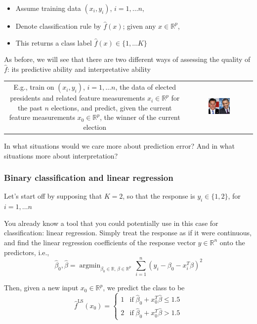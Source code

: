 \documentclass[mathserif]{beamer}
\newcommand{\argmin}{\mathop{\mathrm{argmin}}}
\def\R{\mathds{R}}
\def\hbeta{\hat{\beta}}
\def\red{\color[rgb]{0.8,0,0}}
\begin{document}
\begin{frame}
\frametitle{}
\begin{itemize}
\item Assume training data $(x_i,y_i)$, $i=1,\ldots n$, 
\item Denote
classification rule by $\hat{f}(x)$; given any $x \in \R^p$, 
\item This returns a 
class label $\hat{f}(x) \in \{1,\ldots K\}$
\end{itemize}

\bigskip
As before, we will see that there are two different ways of assessing the quality 
of $\hat{f}$: its {\red predictive ability} and {\red interpretative ability}

\bigskip
\begin{tabular}{cc}
\parbox{0.5\textwidth}{
E.g., train on $(x_i,y_i)$, $i=1,\ldots n$, the data of elected presidents
and related feature measurements $x_i \in \R^p$ for the past $n$ elections,
and predict, given the current feature measurements $x_0 \in \R^p$, the winner 
of the current election}&
\hspace{3pt}
\parbox{0.35\textwidth}{
\includegraphics[width=0.35\textwidth]{candidates.jpg}
}
\end{tabular}

\bigskip
In what situations would we care more about prediction error? And in what 
situations more about interpretation?
\end{frame}

\begin{frame}
\frametitle{Binary classification and linear regression}
Let's start off by supposing that $K=2$, so that the response is 
$y_i \in \{1,2\}$, for $i=1,\ldots n$

\bigskip
You already know a tool that you could potentially use in this case for classification:
{\red linear regression}. Simply treat the response
as if it were continuous, and find the linear regression coefficients 
of the response vector $y \in \R^n$ onto the predictors, i.e., 
$$\hbeta_0, \hbeta = \argmin_{\beta_0\in\R, \,\beta \in \R^p} \, 
\sum_{i=1}^n (y_i - \beta_0 - x_i^T \beta)^2 $$

Then, given a new input $x_0 \in \R^p$, we predict the class to be
$$\hat{f}^\mathrm{LS}(x_0) = \begin{cases}
1 & \mathrm{if}\; \hbeta_0 + x_0^T \hbeta \leq 1.5 \\
2 & \mathrm{if}\; \hbeta_0 + x_0^T \hbeta  > 1.5
\end{cases}$$
\end{frame}
\end{document}
